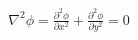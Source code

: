 \documentclass[preview]{standalone}
\begin{document}
\begin{align*}
\nabla^2\phi = \frac{\partial^2\phi}{\partial x^2} + \frac{\partial^2\phi}{\partial y^2} = 0
\end{align*}
\end{document}
